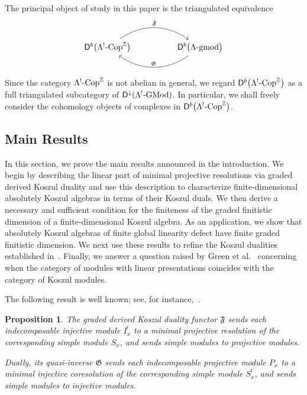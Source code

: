 \documentclass[11pt]{article}
\newtheorem{proposition}[theorem]{Proposition}
\theoremstyle{definition}
\theoremstyle{remark}
\begin{document}
The principal object of study in this paper is the triangulated equivalence
\[
\begin{tikzcd}[column sep=huge]
\mathsf{D}^b\bigl(\Lambda^{!}\textup{-Cop}^{\mathbb{Z}}\bigr)
\arrow[r, bend left=35, "\mathfrak{F}"]
&
\mathsf{D}^b\bigl(\Lambda\textup{-gmod}\bigr)
\arrow[l, bend left=35, "\mathfrak{G}"']
\end{tikzcd}
\]
Since the category \(\Lambda^{!}\textup{-Cop}^{\mathbb{Z}}\) is not abelian in general, we regard
\(\mathsf{D}^b\bigl(\Lambda^{!}\textup{-Cop}^{\mathbb{Z}}\bigr)\) as a full triangulated subcategory of
\(\mathsf{D}^{\downarrow}(\Lambda^{!}\textup{-GMod})\). In particular, we shall freely consider the cohomology objects of complexes in
\(\mathsf{D}^b\bigl(\Lambda^{!}\textup{-Cop}^{\mathbb{Z}}\bigr)\).
\begin{center}
\section{Main Results}
\end{center}
In this section, we prove the main results announced in the introduction. We begin by describing the linear part of minimal projective resolutions via graded derived Koszul duality and use this description to characterize finite-dimensional absolutely Koszul algebras in terms of their Koszul duals. We then derive a necessary and sufficient condition for the finiteness of the graded finitistic dimension of a finite-dimensional Koszul algebra. As an application, we show that absolutely Koszul algebras of finite global linearity defect have finite graded finitistic dimension. We next use these results to refine the Koszul dualities established in~\cite{4}. Finally, we answer a question raised by Green et al.~\cite{12} concerning when the category of modules with linear presentations coincides with the category of Koszul modules.

\medskip 

The following result is well known; see, for instance,~\cite{3,4,7,20}.

\begin{proposition}
The graded derived Koszul duality functor $\mathfrak{F}$ sends each indecomposable injective module $I^{!}_{x}$ to a minimal projective resolution of the corresponding simple module $S_{x}$, and sends simple modules to projective modules.

Dually, its quasi-inverse $\mathfrak{G}$ sends each indecomposable projective module $P_{x}$ to a minimal injective coresolution of the corresponding simple module $S^{!}_{x}$, and sends simple modules to injective modules.
\end{proposition}
\end{document}
